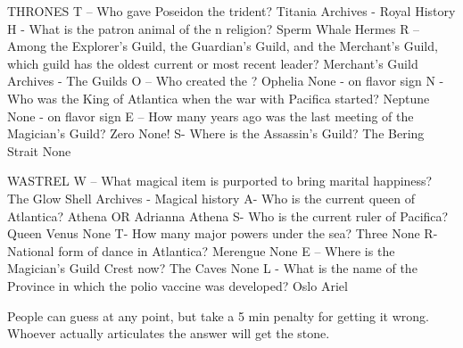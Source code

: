 \documentclass[green]{NeptuneBall}
\begin{document}
\name{\gWishingStone{}}

THRONES
T – Who gave Poseidon the trident?
Titania
Archives - Royal History
H - What is the patron animal of the \pAtlantica{}n religion?
Sperm Whale
Hermes
R –  Among the Explorer's Guild, the Guardian's Guild, and the Merchant's Guild, which guild has the oldest current or most recent leader?
Merchant’s Guild
Archives - The Guilds
O – Who created the \sArtifactTwo{}?
Ophelia
None - on flavor sign
N - Who was the King of Atlantica when the war with Pacifica started?
Neptune
None - on flavor sign
E – How many years ago was the last meeting of the Magician’s Guild?
Zero
None!
S- Where is the Assassin's Guild?
The Bering Strait
None

WASTREL
W – What magical item is purported to bring marital happiness?
The Glow Shell
Archives - Magical history
A- Who is the current queen of Atlantica?
Athena OR Adrianna
Athena
S- Who is the current ruler of Pacifica?
Queen Venus
None
T- How many major powers under the sea?
Three
None
R- National form of dance in Atlantica?
Merengue
None
E – Where is the Magician’s Guild Crest now?
The Caves
None
L - What is the name of the Province in which the polio vaccine was developed?
Oslo
Ariel

People can guess at any point, but take a 5 min penalty for getting it wrong. Whoever actually articulates the answer will get the stone.
\end{document}
